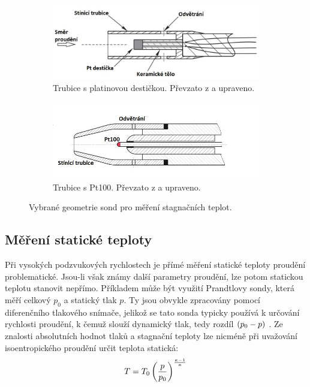 \begin{figure}[ht!]
                \begin{subfigure}{.45\textwidth}
                    \includegraphics[width=\textwidth]{100_MERENI_TEPLOT/Bonham2013-ptfilm.jpg}
                    \caption{Trubice s platinovou destičkou.  Převzato \linebreak z \cite{Bonham2013} a upraveno.}
                \end{subfigure} \hspace{.05\textwidth}
                \begin{subfigure}{.45\textwidth}
                    \includegraphics[width=\textwidth]{100_MERENI_TEPLOT/Sedlak2018-Pt100.jpg}
                    \caption{Trubice s Pt100. Převzato z \cite{Sedlak2018} a upraveno.}
                    \label{subfig:sonda-sedlak}
                \end{subfigure}

                \caption{Vybrané geometrie sond pro měření stagnačních teplot.}
                \label{fig:konstrukce-mereni-T0}
            \end{figure}

    \subsection{Měření statické teploty}
        Při vysokých podzvukových rychlostech je přímé měření statické teploty proudění problematické. Jsou-li však známy další parametry proudění, lze potom statickou teplotu stanovit nepřímo. Příkladem může být využití Prandtlovy sondy, která měří celkový $p_0$ a statický tlak $p$. Ty jsou obvykle zpracovány pomocí diferenčního tlakového snímače, jelikož se tato sonda typicky používá k určování rychlosti proudění, k čemuž slouží dynamický tlak, tedy rozdíl $\left( p_0 - p \right)$ \cite{Houghton2013}. Ze znalosti absolutních hodnot tlaků a stagnační teploty lze nicméně při uvažování isoentropického proudění určit teplota statická:
        \begin{equation}
            T = T_0 \left( \frac{p}{p_0} \right) ^{\frac{\kappa - 1}{\kappa}}
        \end{equation}
            

    